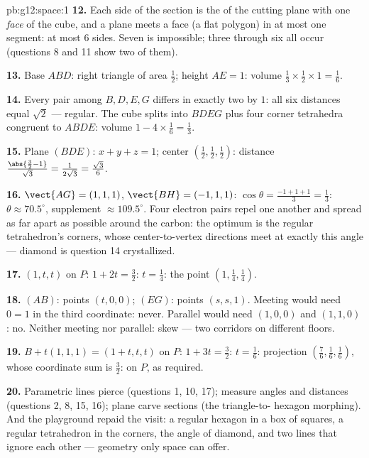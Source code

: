\begin{solution}{pb:g12:space:1}
\textbf{12.} Each side of the section is the  of
the cutting plane with one \emph{face} of the cube, and a
plane meets a face (a flat polygon) in at most one segment:
at most $6$ sides. Seven is impossible; three through six all
occur (questions 8 and 11 show two of them).

\textbf{13.} Base $ABD$: right triangle of area $\frac12$;
height $AE = 1$: volume
$\frac13 \times \frac12 \times 1 = \frac16$.

\textbf{14.} Every pair among $B, D, E, G$ differs in exactly
two  by $1$: all six distances equal $\sqrt2$ ---
regular. The cube splits into $BDEG$ plus four corner
tetrahedra congruent to $ABDE$: volume
$1 - 4 \times \frac16 = \frac13$.

\textbf{15.} Plane $(BDE)$: $x + y + z = 1$; center
$\left(\frac12,\frac12,\frac12\right)$: distance
$\frac{\abs{\frac32 - 1}}{\sqrt3} = \frac{1}{2\sqrt3} =
\frac{\sqrt3}{6}$.

\textbf{16.} $\vect{AG} = (1,1,1)$,
$\vect{BH} = (-1,1,1)$: $\cos\theta = \frac{-1 + 1 + 1}{3} =
\frac13$: $\theta \approx 70.5^\circ$, supplement
$\approx 109.5^\circ$. Four electron pairs repel one another
and spread as far apart as possible around the carbon: the
optimum is the regular tetrahedron's corners, whose
center-to-vertex directions meet at exactly this angle ---
diamond is question 14 crystallized.

\textbf{17.} $(1, t, t)$ on $P$: $1 + 2t = \frac32$:
$t = \frac14$: the point $\left(1, \frac14, \frac14\right)$.

\textbf{18.} $(AB)$: points $(t, 0, 0)$; $(EG)$: points
$(s, s, 1)$. Meeting would need $0 = 1$ in the third
coordinate: never. Parallel would need $(1,0,0)$ and
$(1,1,0)$ : no. Neither meeting nor parallel: skew
--- two corridors on different floors.

\textbf{19.} $B + t(1,1,1) = (1 + t, t, t)$ on $P$:
$1 + 3t = \frac32$: $t = \frac16$: projection
$\left(\frac76, \frac16, \frac16\right)$, whose coordinate sum
is $\frac32$: on $P$, as required.

\textbf{20.} Parametric lines pierce (questions 1, 10, 17);
 measure angles and distances (questions 2, 8,
15, 16); plane  carve sections (the triangle-to-
hexagon morphing). And the playground repaid the visit: a
regular hexagon in a box of squares, a regular tetrahedron in
the corners, the angle of diamond, and two lines that ignore
each other --- geometry only space can offer.
\end{solution}
